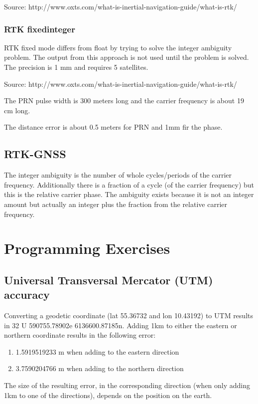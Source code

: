 \documentclass[a4paper,10pt,fleqn]{article}
\begin{document}
Source: http://www.oxts.com/what-is-inertial-navigation-guide/what-is-rtk/

\subsubsection{RTK fixed\/integer}
RTK fixed mode differs from float by trying to solve the integer ambiguity problem. The output from this approach is not used until the problem is solved. The precision is 1 mm and requires 5 satellites. 

Source: http://www.oxts.com/what-is-inertial-navigation-guide/what-is-rtk/

The PRN pulse width is 300 meters long and the carrier frequency is about 19 cm long.

The distance error is about 0.5 meters for PRN and 1mm fir the phase.

\subsection{RTK-GNSS}
The integer ambiguity is the number of whole cycles/periods of the carrier frequency. Additionally there is a fraction of a cycle (of the carrier frequency) but this is the relative carrier phase. The ambiguity exists because it is not an integer amount but actually an integer plus the fraction from the relative carrier frequency.

\section{Programming Exercises}

\subsection{Universal Transversal Mercator (UTM) accuracy}
Converting a geodetic coordinate (lat 55.36732 and lon 10.43192) to UTM results in 32 U 590755.78902e 6136600.87185n. Adding 1km to either the eastern or northern coordinate results in the following error:

\begin{enumerate}
\item 1.5919519233 m when adding to the eastern direction
\item 3.7590204766 m when adding to the northern direction
\end{enumerate}

The size of the resulting error, in the corresponding direction (when only adding 1km to one of the directions), depends on the position on the earth.
\end{document}

